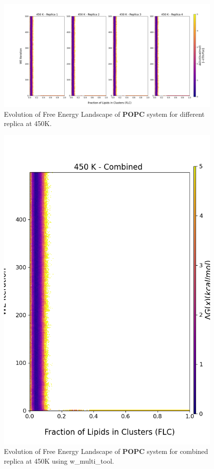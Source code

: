 \documentclass{biophys-new}
\begin{document}
\begin{figure}[hbt!]
\centering
\includegraphics[width=1.1\linewidth]{all_plots/ClusterLipids2Total/DPPC_POPC_CHOL/450K/Evolution_POPC_450_ClusterLipids2Total.png}
\caption{Evolution of Free Energy Landscape of \textbf{POPC} system for different replica at 450K.}
\label{fig:view}

\end{figure}

\begin{figure}[hbt!]
\centering
\includegraphics[width=0.8\linewidth]{all_plots/ClusterLipids2Total/DPPC_POPC_CHOL/450K/Evolution_POPC_MULTI__450_ClusterLipids2Total.png}
\caption{Evolution of Free Energy Landscape of \textbf{POPC} system for combined replica at 450K using w\_multi\_tool.}
\label{fig:view}

\end{figure}


\end{document}
